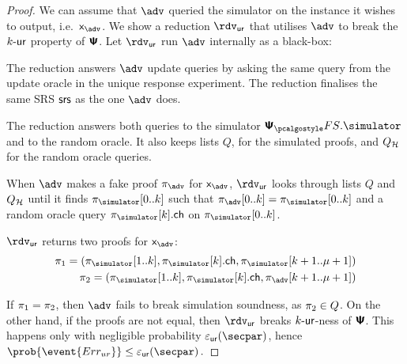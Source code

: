 \begin{proof}
  We can assume that $\adv$ queried the simulator on the instance it wishes to
  output, i.e.~$\inp_{\adv}$. We show a reduction $\rdvur$ that utilises $\adv$
  to break the ${k\text{-}\mathsf{ur}}$ property of $\bm{\mathsf{\Psi}}$. Let $\rdvur$ run $\advse$ internally
  as a black-box:
  \begin{compactitem}
  	\item The reduction answers $\adv$ update queries by asking the same query from the update oracle in the unique response experiment. The reduction finalises the same SRS $\mathsf{srs}$ as the one $\adv$ does.
  	\item The reduction answers both queries to the simulator $\psfs.\simulator$
  	and to the random oracle.  It also keeps lists $Q$, for the simulated
  	proofs, and $Q_{\mathcal{H}}$ for the random oracle queries.
  	\item When $\adv$ makes a fake proof $\zkproof_{\adv}$ for $\inp_{\adv}$,
  	$\rdvur$ looks through lists $Q$ and $Q_{\mathcal{H}}$ until it finds
  	$\zkproof_{\simulator}[0..k]$ such that
  	$\zkproof_{\adv}[0..k] = \zkproof_{\simulator}[0..k]$ and a random oracle
  	query $\zkproof_{\simulator}[k].\ch$ on $\zkproof_{\simulator}[0..k]$.
  	\item $\rdvur$ returns two proofs for $\inp_{\adv}$:
  	\begin{align*}
  	\zkproof_1 = (\zkproof_{\simulator}[1..k],
  	\zkproof_{\simulator}[k].\ch, \zkproof_{\simulator}[k + 1..\mu + 1])\\
  	\zkproof_2 = (\zkproof_{\simulator}[1..k],
  	\zkproof_{\simulator}[k].\ch, \zkproof_{\adv}[k + 1..\mu + 1])
  	\end{align*}
  \end{compactitem}  
  If $\pi_1 = \pi_2$, then $\adv$ fails to break simulation soundness,
  as $\pi_2 \in Q$. On the other hand, if the proofs are not equal, then
  $\rdvur$ breaks ${k\text{-}\mathsf{ur}}$-ness of $\bm{\mathsf{\Psi}}$. This happens only with negligible
  probability $\epsur(\secpar)$, hence
  \( \prob{\event{\errur}} \leq \epsur(\secpar)\,. \)

\end{proof}
